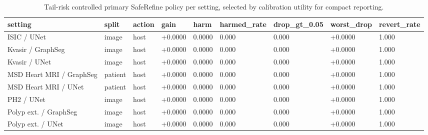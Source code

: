 \begin{table}[t]
\centering
\small
\caption{Tail-risk controlled primary SafeRefine policy per setting, selected by calibration utility for compact reporting.}
\label{tab:tail_risk_primary_best}
\begin{tabular}{lllllllll}
\toprule
setting & split & action & gain & harm & harmed\_rate & drop\_gt\_0.05 & worst\_drop & revert\_rate \\
\midrule
ISIC / UNet & image & host & +0.0000 & 0.0000 & 0.000 & 0.000 & +0.0000 & 1.000 \\
Kvasir / GraphSeg & image & host & +0.0000 & 0.0000 & 0.000 & 0.000 & +0.0000 & 1.000 \\
Kvasir / UNet & image & host & +0.0000 & 0.0000 & 0.000 & 0.000 & +0.0000 & 1.000 \\
MSD Heart MRI / GraphSeg & patient & host & +0.0000 & 0.0000 & 0.000 & 0.000 & +0.0000 & 1.000 \\
MSD Heart MRI / UNet & patient & host & +0.0000 & 0.0000 & 0.000 & 0.000 & +0.0000 & 1.000 \\
PH2 / UNet & image & host & +0.0000 & 0.0000 & 0.000 & 0.000 & +0.0000 & 1.000 \\
Polyp ext. / GraphSeg & image & host & +0.0000 & 0.0000 & 0.000 & 0.000 & +0.0000 & 1.000 \\
Polyp ext. / UNet & image & host & +0.0000 & 0.0000 & 0.000 & 0.000 & +0.0000 & 1.000 \\
\bottomrule
\end{tabular}
\end{table}
